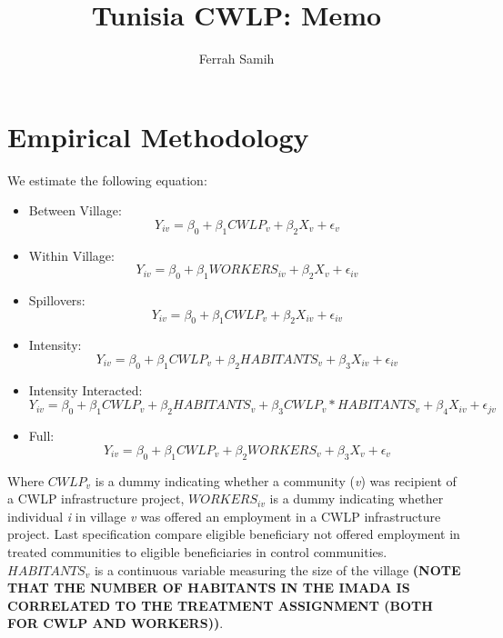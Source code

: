 \documentclass[10pt,a4paper]{article}
\begin{document}
\author{Ferrah Samih}\title{Tunisia CWLP: Memo}\maketitle
\pagebreak
\tableofcontents
\pagebreak

\section{Empirical Methodology}


We estimate the following equation:
\begin{itemize}
	\item Between Village: \begin{equation} Y_{iv} = \beta_{0} + \beta_{1}CWLP_{v} + \beta_{2}X_{v} + \epsilon_{v} \end{equation}
	
	\item Within Village: \begin{equation} Y_{iv} = \beta_{0} + \beta_{1}WORKERS_{iv} + \beta_{2}X_{v} + \epsilon_{iv} \end{equation}
	
	\item Spillovers: \begin{equation} Y_{iv} = \beta_{0} + \beta_{1}CWLP_{v} + \beta_{2}X_{iv} + \epsilon_{iv} \end{equation}
	
	\item Intensity: \begin{equation} Y_{iv} = \beta_{0} + \beta_{1}CWLP_{v} + \beta_{2}HABITANTS_{v} + \beta_{3}X_{iv} + \epsilon_{iv} \end{equation}
	
	\item Intensity Interacted: \begin{equation} Y_{iv} = \beta_{0} + \beta_{1}CWLP_{v} + \beta_{2}HABITANTS_{v} + \beta_{3}CWLP_{v}*HABITANTS_{v} + \beta_{4}X_{iv} + \epsilon_{jv} \end{equation}
	
	\item Full: \begin{equation} Y_{iv} = \beta_{0} + \beta_{1}CWLP_{v} + \beta_{2}WORKERS_{v} + \beta_{3}X_{v} + \epsilon_{v} \end{equation}
	
\end{itemize}

Where $CWLP_{v}$ is a dummy indicating whether a community (\textit{v}) was recipient of a CWLP infrastructure project, $WORKERS_{iv}$ is a dummy indicating whether individual \textit{i} in village \textit{v} was offered an employment in a CWLP infrastructure project. Last specification compare eligible beneficiary not offered employment in treated communities to eligible beneficiaries in control communities. $HABITANTS_{v}$ is a continuous variable measuring the size of the village \textbf{(NOTE THAT THE NUMBER OF HABITANTS IN THE IMADA IS CORRELATED TO THE TREATMENT ASSIGNMENT (BOTH FOR CWLP AND WORKERS))}. 
\end{document}
